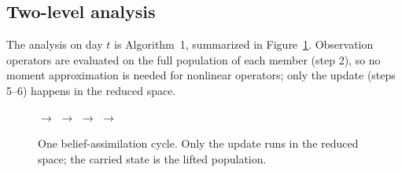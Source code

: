 \documentclass[10pt]{article}
\theoremstyle{remark}
\begin{document}
\subsection{Two-level analysis}
The analysis on day $t$ is Algorithm~1, summarized in Figure~\ref{fig:cycle}. Observation operators are evaluated on the full population of each member (step 2), so no moment approximation is needed for nonlinear operators; only the update (steps 5--6) happens in the reduced space.

\begin{figure}[t]
\centering\small
{}
$\rightarrow$
$\rightarrow$
$\rightarrow$
$\rightarrow$
\caption{One belief-assimilation cycle. Only the update runs in the reduced space; the carried state is the lifted population.}
\label{fig:cycle}
\end{figure}
\end{document}
